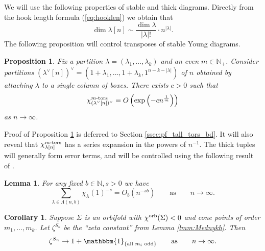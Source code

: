 \documentclass{amsart}
\newtheorem{corollary}[conjecture]{Corollary}
\newtheorem{lemma}[conjecture]{Lemma}
\newtheorem{proposition}[conjecture]{Proposition}
\newcommand{\cho}{\chi^{\textnormal{orb}}}
\newcommand{\tn}{\textnormal}
\begin{document}
We will use the following properties of stable and thick diagrams. Directly from the hook length formula (\ref{eq:hooklen}) we obtain that
\begin{equation}\label{eq:growing_row_dim}
\dim\lambda[n]\sim\frac{\dim\lambda}{|\lambda|!}\cdot n^{|\lambda|}.
\end{equation}
The following proposition will control transposes of stable Young diagrams.
\begin{proposition}\label{prop:tall_tors_bd}
Fix a partition $\lambda=(\lambda_1,\dots,\lambda_k)$ and an even $m\in\mathbb{N}_+$. Consider partitions $(\lambda^\vee[n])^\vee=(1+\lambda_1,\dots,1+\lambda_k,1^{n-k-|\lambda|})$ of $n$ obtained by attaching $\lambda$ to a single column of boxes. There exists $c>0$ such that
\begin{equation*}
\chi_{(\lambda^\vee[n])^\vee}^{m\tn{-tors}}=O\left(\exp\left(-cn^{\frac{1}{m}}\right)\right)
\end{equation*}
as $n\to\infty$.
\end{proposition}
Proof of Proposition \ref{prop:tall_tors_bd} is deferred to Section \ref{ssec:pf_tall_tors_bd}. It will also reveal that $\chi^{m\tn{-tors}}_{\lambda[n]}$ has a series expansion in the powers of $n^{-1}$. The thick tuples will generally form error terms, and will be controlled using the following result of \cites[Proposition 2.5]{fuchsian_gps_coverings_Riemann_surfaces_subgp_growth_random_quots_walks_LiebeckShalev04}[Proposition 4.2]{Poisson_Dirichlet_distribution_rand_Belyi_surfaces_Gamburd06}.
\begin{lemma}\label{lmm:LSG}
For any fixed $b\in\mathbb{N},s>0$ we have
\begin{equation*}
\sum_{\lambda\in\Lambda(n,b)}\chi_\lambda(1)^{-s}=O_b(n^{-sb})\qquad\text{as}\qquad n\to\infty.
\end{equation*}
\end{lemma}
\begin{corollary}\label{corr:zeta_asymptotics}
Suppose $\Sigma$ is an orbifold with $\cho(\Sigma)<0$ and cone points of order $m_1,\dots,m_k$. Let $\zeta^{S_n}$ be the ``zeta constant'' from Lemma \ref{lmm:Mednykh}. Then
\begin{equation*}
\zeta^{S_n}\to1+\mathbbm{1}_{\{\text{all }m_i\text{ odd}\}}\qquad\text{as}\qquad n\to\infty.
\end{equation*}
\end{corollary}
\end{document}

